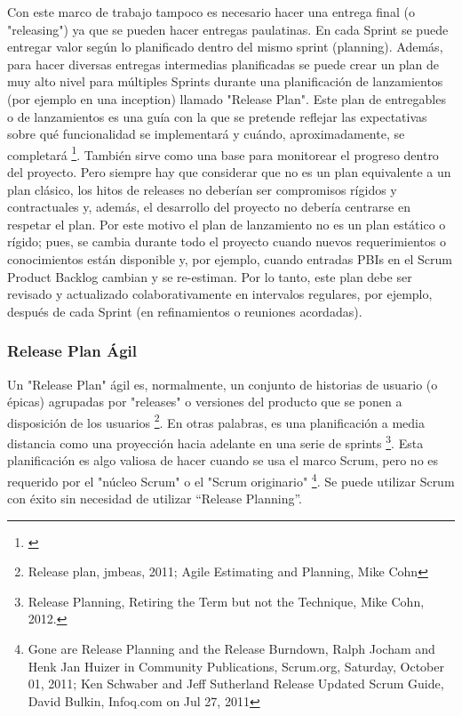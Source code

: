 Con este marco de trabajo tampoco es necesario hacer una entrega final (o "releasing") ya que se pueden hacer entregas paulatinas. En cada Sprint se puede entregar valor según lo planificado dentro del mismo sprint (planning). Además, para hacer diversas entregas intermedias planificadas se puede crear un plan de muy alto nivel para múltiples Sprints durante una planificación de lanzamientos (por ejemplo en una inception) llamado "Release Plan". Este plan de entregables o de lanzamientos es una guía con la que se pretende reflejar las expectativas sobre qué funcionalidad se implementará y cuándo, aproximadamente, se completará \footnote{\cite{Scrum-Institute-2015}}. También sirve como una base para monitorear el progreso dentro del proyecto. Pero siempre hay que considerar que no es un plan equivalente a un plan clásico, los hitos de releases no deberían ser compromisos rígidos y contractuales y, además, el desarrollo del proyecto no debería centrarse en respetar el plan. Por este motivo el plan de lanzamiento no es un plan estático o rígido; pues, se cambia durante todo el proyecto cuando nuevos requerimientos o conocimientos están disponible y, por ejemplo, cuando entradas PBIs en el Scrum Product Backlog cambian y se re-estiman. Por lo tanto, este plan debe ser revisado y actualizado colaborativamente en intervalos regulares, por ejemplo, después de cada Sprint (en refinamientos o reuniones acordadas).

\subsubsection{Release Plan Ágil}

Un "Release Plan" ágil es, normalmente, un conjunto de historias de usuario (o épicas) agrupadas por "releases" o versiones del producto que se ponen a disposición de los usuarios \footnote{Release plan, jmbeas, 2011; Agile Estimating and Planning, Mike Cohn}. En otras palabras, es una planificación a media distancia como una proyección hacia adelante en una serie de sprints \footnote{Release Planning, Retiring the Term but not the Technique, Mike Cohn, 2012.}. Esta planificación es algo valiosa de hacer cuando se usa el marco Scrum, pero no es requerido por el "núcleo Scrum" o el "Scrum originario" \footnote{Gone are Release Planning and the Release Burndown, Ralph Jocham and Henk Jan Huizer in Community Publications, Scrum.org, Saturday, October 01, 2011; Ken Schwaber and Jeff Sutherland Release Updated Scrum Guide, David Bulkin, Infoq.com on Jul 27, 2011}. Se puede utilizar Scrum con éxito sin necesidad de utilizar “Release Planning”.


